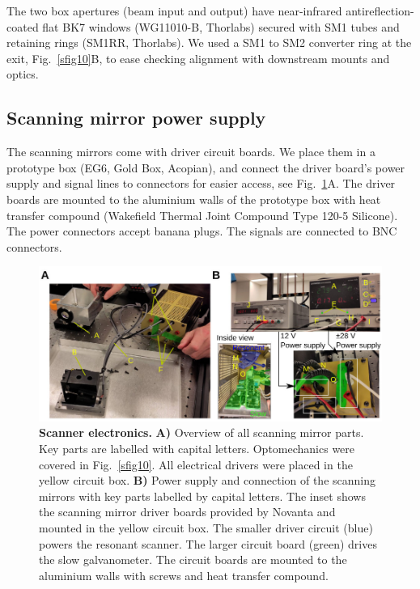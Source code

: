 \documentclass[10pt,letterpaper]{article}
\begin{document}
The two box apertures (beam input and output) have near-infrared antireflection-coated flat BK7 windows (WG11010-B, Thorlabs) secured with SM1 tubes and retaining rings (SM1RR, Thorlabs). We used a SM1 to SM2 converter ring at the exit, Fig.~\ref{sfig10}B, to ease checking alignment with downstream mounts and optics.

\subsection{Scanning mirror power supply}
%
The scanning mirrors come with driver circuit boards. We place them in a prototype box (EG6, Gold Box, Acopian), and connect the driver board's power supply and signal lines to connectors for easier access, see Fig.~\ref{sfig11}A. The driver boards are mounted to the aluminium walls of the prototype box with heat transfer compound (Wakefield Thermal Joint Compound Type 120-5 Silicone). The power connectors accept banana plugs. The signals are connected to BNC connectors.
%
\begin{figure}[t]
    \includegraphics[width=\textwidth]{sfig11.jpg}
  \caption{{\bf Scanner electronics.} \textbf{A)} Overview of all scanning mirror parts. Key parts are labelled with capital letters. Optomechanics were covered in Fig.~\ref{sfig10}. All electrical drivers were placed in the yellow circuit box. \textbf{B)} Power supply and connection of the scanning mirrors with key parts labelled by capital letters. The inset shows the scanning mirror driver boards provided by Novanta and mounted in the yellow circuit box. The smaller driver circuit (blue) powers the resonant scanner. The larger circuit board (green) drives the slow galvanometer. The circuit boards are mounted to the aluminium walls with screws and heat transfer compound.}
  \label{sfig11}
\end{figure}
%
\end{document}
